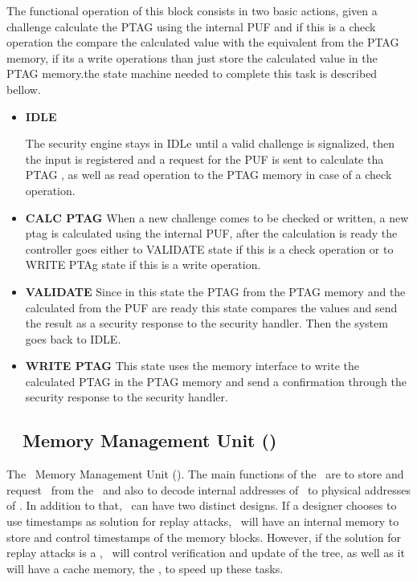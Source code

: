 The functional operation of this block consists in two basic actions, given a challenge
calculate the PTAG  using the internal PUF  and if this is a check operation the compare
 the calculated value with the equivalent from the PTAG memory, if its a write operations
 than just store the calculated value in the PTAG memory.the state machine needed to complete
 this task is described bellow.

\begin{itemize}
  \item{\textbf{IDLE}}
 
The security engine stays in  IDLe  until a valid challenge is signalized, then the input is 
registered and a request for the PUF is sent to calculate tha PTAG , as well as read operation 
 to the PTAG memory  in case of a check operation.
 
  \item{\textbf{CALC PTAG}}
  When  a new challenge comes to be checked or written, a new ptag is calculated using the internal PUF, 
  after the calculation is ready the controller goes either to VALIDATE state if this is a check operation
  or to WRITE PTAg state if this is a write operation.
  

  \item{\textbf{VALIDATE}}
  Since in this state the PTAG from the PTAG memory and the calculated from the PUF are ready this state compares
  the values and send the result as a security response to the security handler. Then  the system goes back to IDLE.
  

 \item{\textbf{WRITE PTAG}}
 This state  uses the memory interface to  write the calculated PTAG in the PTAG memory and send a confirmation
 through the security response to the security handler.



\end{itemize}






\subsection{\ptag~ Memory Management Unit (\pmmu)}
\label{subsec:pmmu}
The \ptag~Memory Management Unit (\pmmu). The main functions of the \pmmu~are to store and request \ptags~from the \ptagmem~and also to decode internal addresses of \ptags~to physical addresses of \ptagmem. In addition to that, \pmmu~can have two distinct designs. If a designer chooses to use timestamps as solution for replay attacks, \pmmu~will have an internal memory to store and control timestamps of the memory blocks. However, if the solution for replay attacks is a \mt\cite{Elbaz2009}, \pmmu~will control verification and update of the tree, as well as it will have a cache memory, the \ptagcache, to speed up these tasks.
